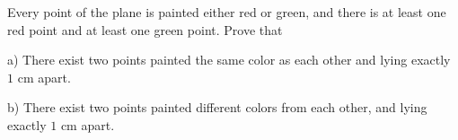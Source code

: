 Every point of the plane is painted either red or green, and there is at least one red point and at least one green point. Prove that

a) There exist two points painted the same color as each other and lying exactly $1$ cm apart.

b)  There exist two points painted different colors from each other, and lying exactly $1$ cm apart.
